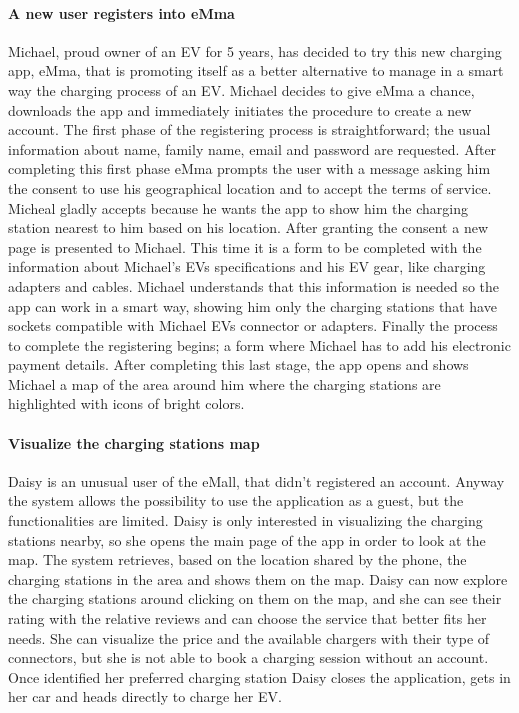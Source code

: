 \paragraph{A new user registers into eMma}
Michael, proud owner of an EV for 5 years, has decided to try this new charging app, eMma, that is promoting itself as a better alternative to manage in a smart way the charging process of an EV. Michael decides to give eMma a chance, downloads the app and immediately initiates the procedure to create a new account. The first phase of the registering process is straightforward; the usual information about name, family name, email and password are requested. After completing this first phase eMma prompts the user with a message asking him the consent to use his geographical location and to accept the terms of service. Micheal gladly accepts because he wants the app to show him the charging station nearest to him based on his location. After granting the consent a new page is presented to Michael. This time it is a form to be
completed with the information about Michael’s EVs specifications and his EV gear, like charging adapters and cables. Michael understands that this information is needed so the app can work in a smart way, showing him only the charging stations that have sockets compatible with Michael EVs connector or adapters. Finally the process to complete the registering begins; a form where Michael has to add his electronic payment details. After completing this last stage, the app opens and shows Michael a map of the area around him where the charging stations are highlighted with icons of bright colors.


\paragraph{Visualize the charging stations map}
Daisy is an unusual user of the eMall, that didn't registered an account. Anyway the system allows the possibility to use the application as a guest, but the functionalities are limited. Daisy is only interested in visualizing the charging stations nearby, so she opens the main page of the app in order to look at the map. The system retrieves, based on the location shared by the phone, the charging stations in the area and shows them on the map. Daisy can now explore the charging stations around clicking on them on the map, and she can see their rating with the relative reviews and can choose the service that better fits her needs. She can visualize the price and the available chargers with their type of connectors, but she is not able to book a charging session without an account. Once identified her preferred charging station Daisy closes the application, gets in her car and heads directly to charge her EV.

